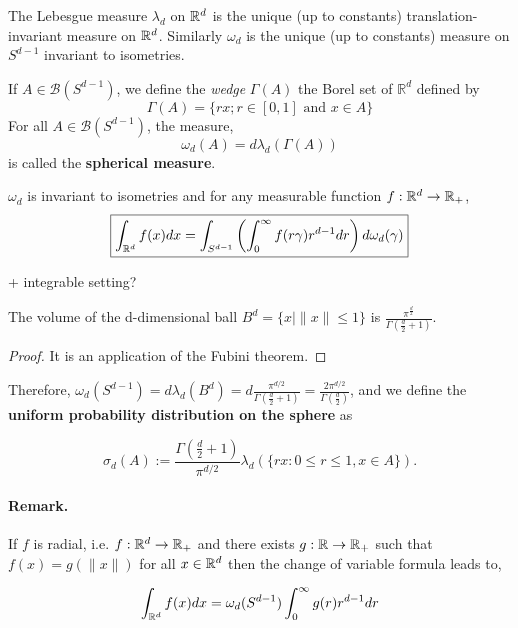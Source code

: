 \documentclass{article}
\begin{document}
The Lebesgue measure $\lambda_d$ on $\mathbb{R}^{d}$ is the unique (up to constants)
translation-invariant measure on $\mathbb{R}^{d}$. Similarly $\omega_d$ is the unique (up to
constants) measure on $S^{d-1}$ invariant to isometries.

\begin{definition}
  If $A \in \mathcal{B}\left(S^{d-1}\right)$, we define the \emph{wedge} $\Gamma(A)$ the Borel set
  of $\mathbb{R}^{d}$ defined by
  $$
  \Gamma(A)=\{r x ; r \in[0,1] \text { and } x \in A\}
  $$
  For all $A \in \mathcal{B}\left(S^{d-1}\right)$, the measure,
  $$
  \omega_{d}(A)=d \lambda_{d}(\Gamma(A))
  $$
  is called the \textbf{spherical measure}. 
\end{definition}

\begin{theorem}
  $\omega_d$ is invariant to isometries and for any measurable function $f: \mathbb{R}^{d} \to \mathbb{R}_+$, $$\boxed{\int_{\mathbb{R}^{d}} f(x) d x=\int_{S^{d-1}}\left(\int_{0}^{\infty} f(r \gamma) r^{d-1} d r\right) d \omega_d(\gamma)}$$
\end{theorem}

+ integrable setting? 

\begin{prop}
  The volume of the d-dimensional ball $B^d = \{x \mid \|x\| \leq 1\} $ is $\frac{\pi^{\frac{d}{2}}}{\Gamma\left(\frac{d}{2}+1\right)}$.
\end{prop}

\begin{proof}
  It is an application of the Fubini theorem.
\end{proof}
Therefore, $\omega_d(S^{d-1}) = d\lambda_d(B^d) = d\frac{\pi^{d /
    2}}{\Gamma\left(\frac{d}{2}+1\right)} = \frac{2 \pi^{d /
    2}}{\Gamma\left(\frac{d}{2}\right)} $, and we define the \textbf{uniform
  probability distribution on the sphere} as

\begin{equation}
  \sigma_{d}(A):=\frac{\Gamma\left(\frac{d}{2}+1\right)}{\pi^{d / 2}} \lambda_{d}(\{r x: 0 \leq r \leq 1, x \in A\}).
\end{equation}

\paragraph{Remark.} If $f$ is radial, i.e. $f: \mathbb{R}^{d}\to \mathbb{R}_+$ and there exists $g: \mathbb{R}
\to \mathbb{R}_+$ such that $f(x) = g(\|x\|)$ for all $x \in \mathbb{R}^{d}$ then the change of
variable formula leads to,

\begin{equation}
  \int_{\mathbb{R}^{d}} f(x) d x= \omega_d(S^{d-1})\int_{0}^{\infty} g(r)r^{d-1} d r
\end{equation}
\end{document}
